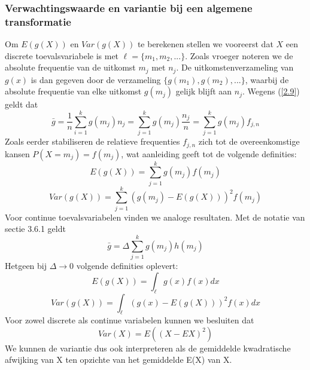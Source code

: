 \documentclass[titlepage]{article}
\numberwithin{equation}{section}
\begin{document}
 \subsubsection{Verwachtingswaarde en variantie bij een algemene transformatie}
 Om $E(g(X))$ en $Var(g(X))$ te berekenen stellen we vooreerst dat $X$ een discrete toevalsvariabele is met $\ell = \{m_1, m_2, ...\}$. Zoals vroeger noteren we de absolute frequentie van de uitkomst $m_j$ met $n_j$. De uitkomstenverzameling van $g(x)$ is dan gegeven door de verzameling $\{g(m_1), g(m_2), ...\}$, waarbij de absolute frequentie van elke uitkomst $g(m_j)$ gelijk blijft aan $n_j$. Wegens (\ref{2.9}) geldt dat
 \begin{equation*}
 	\bar{g}=\frac{1}{n}\sum\limits_{i=1}^k g(m_j)n_j = \sum\limits_{j=1}^k g(m_j) \frac{n_j}{n} = \sum\limits_{j=1}^k g(m_j)f_{j,n}
 \end{equation*}
 Zoals eerder stabiliseren de relatieve frequenties $f_{j,n}$ zich tot de overeenkomstige kansen $P(X = m_j) = f(m_j)$, wat aanleiding geeft tot de volgende definities:
 \begin{equation}
 	E(g(X)) = \sum\limits_{j=1}^k g(m_j)f(m_j)
 	\label{3.27}
 \end{equation}
 \begin{equation}
 	Var(g(X)) = \sum\limits_{j=1}^k (g(m_j)-E(g(X)))^2 f(m_j)
 	\label{3.28}
 \end{equation}
 Voor continue toevalsvariabelen  vinden we analoge resultaten. Met de notatie van sectie 3.6.1 geldt
 \begin{equation*}
 	\bar{g} = \Delta \sum\limits_{j=1}^k g(m_j)h(m_j)
 \end{equation*}
 Hetgeen bij $\Delta \rightarrow 0$ volgende definities oplevert:
 \begin{equation}
 	E(g(X)) = \int_\ell g(x)f(x) dx
 	\label{3.29}
 \end{equation}
 \begin{equation}
 	Var(g(X)) = \int_\ell (g(x)-E(g(X)))^2f(x)dx
 	\label{3.30}
 \end{equation}
 \danger Voor zowel discrete als continue variabelen kunnen we besluiten dat
 \begin{equation}
 	Var(X) = E((X-EX)^2)
 	\label{3.31}
 \end{equation}
 We kunnen de variantie dus ook interpreteren als de gemiddelde kwadratische afwijking van X ten opzichte van het gemiddelde E(X) van X.
\end{document}
